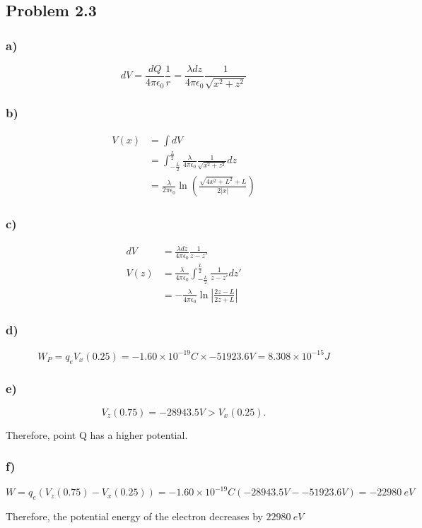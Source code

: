 \documentclass[../homework.tex]{subfiles}
\begin{document}
\subsection{Problem 2.3}
\subsubsection*{a)}
\begin{equation*}
    dV = \frac{dQ}{4 \pi \epsilon_0} \frac{1}{r} = \frac{\lambda dz}{4 \pi \epsilon_0} \frac{1}{\sqrt{x^2 + z^2}}
\end{equation*}

\subsubsection*{b)}
\begin{align*}
    V(x) & = \int dV                                                                                          \\
         & = \int_{-\frac{L}{2}}^{\frac{L}{2}} \frac{\lambda}{4 \pi \epsilon_0} \frac{1}{\sqrt{x^2 + z^2}} dz \\
         & = \frac{\lambda}{2 \pi \epsilon_0} \ln \left(
    \frac{\sqrt{4x^2+L^2} + L}{2|x|}
    \right)
\end{align*}

\subsubsection*{c)}
\begin{align*}
    dV   & = \frac{\lambda dz}{4 \pi \epsilon_0} \frac{1}{z - z'}                                    \\
    V(z) & = \frac{\lambda}{4 \pi \epsilon_0} \int_{-\frac{L}{2}}^{\frac{L}{2}} \frac{1}{z - z'} dz' \\
         & = -\frac{\lambda}{4 \pi \epsilon_0} \ln \left|
    \frac{2z-L}{2z+L}
    \right|
\end{align*}

\subsubsection*{d)}
\begin{equation*}
    W_{P} = q_e V_x(0.25) = -1.60 \times 10^{-19}C \times -51923.6V = 8.308 \times 10^{-15}J
\end{equation*}

\subsubsection*{e)}
\begin{equation*}
    V_z(0.75) = -28943.5V > V_x(0.25).
\end{equation*}

Therefore, point Q has a higher potential.

\subsubsection*{f)}
\begin{equation*}
    W = q_e (V_z(0.75) - V_x(0.25)) = -1.60\times 10^{-19}C (-28943.5V - -51923.6V) = -22980~eV
\end{equation*}

Therefore, the potential energy of the electron decreases by $22980~eV$
\end{document}
